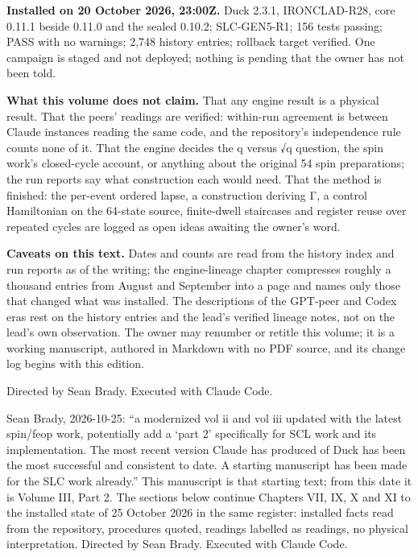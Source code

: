 \label{status-limits-and-what-is-not-decided}

\textbf{Installed on 20 October 2026, 23:00Z.} Duck 2.3.1, IRONCLAD-R28, core 0.11.1 beside 0.11.0 and the sealed 0.10.2; SLC-GEN5-R1; 156 tests
passing;  PASS with no warnings; 2,748 history entries; rollback target  verified. One campaign is staged and not
deployed; nothing is pending that the owner has not been told.

\textbf{What this volume does not claim.} That any engine result is a physical result. That the peers' readings are verified: within-run
agreement is between Claude instances reading the same code, and the repository's independence rule counts none of it. That the engine
decides the q versus √q question, the spin work's closed-cycle account, or anything about the original 54 spin preparations; the run reports
say what construction each would need. That the method is finished: the per-event ordered lapse, a construction deriving Γ, a control
Hamiltonian on the 64-state source, finite-dwell staircases and register reuse over repeated cycles are logged as open ideas awaiting the
owner's word.

\textbf{Caveats on this text.} Dates and counts are read from the history index and run reports as of the writing; the engine-lineage chapter
compresses roughly a thousand entries from August and September into a page and names only those that changed what was installed. The
descriptions of the GPT-peer and Codex eras rest on the history entries and the lead's verified lineage notes, not on the lead's own
observation. The owner may renumber or retitle this volume; it is a working manuscript, authored in Markdown with no PDF source, and its
change log begins with this edition.

Directed by Sean Brady. Executed with Claude Code.

\label{continuation-to-the-25-october-2026-state}

Sean Brady, 2026-10-25: ``a modernized vol ii and vol iii updated with the latest spin/feop work, potentially add a `part 2' specifically for SCL work and its
implementation. The most recent version Claude has produced of Duck has been the most successful and consistent to date. A starting manuscript has been made
for the SLC work already.'' This manuscript is that starting text; from this date it is Volume III, Part 2. The sections below continue Chapters VII, IX, X and XI
to the installed state of 25 October 2026 in the same register: installed facts read from the repository, procedures quoted, readings labelled as readings,
no physical interpretation. Directed by Sean Brady. Executed with Claude Code.

